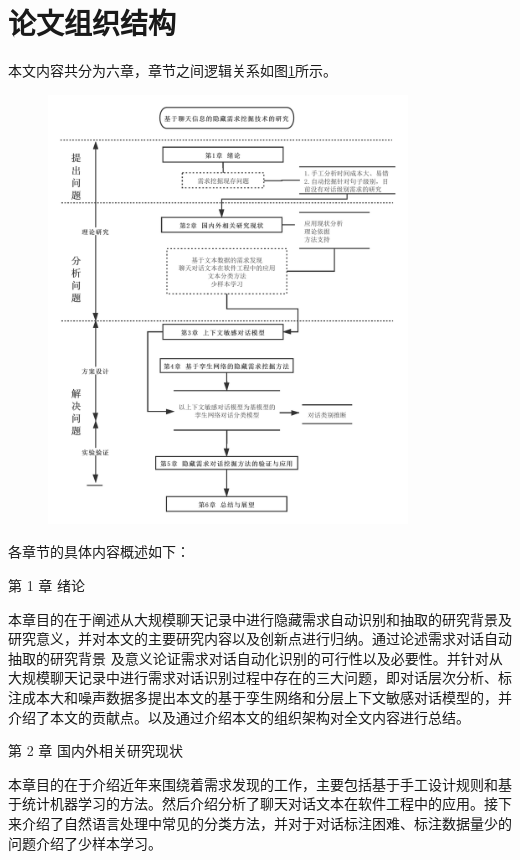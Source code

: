 \section{论文组织结构}
本文内容共分为六章，章节之间逻辑关系如图\ref{fig:chapters}所示。
\begin{figure}[htb]
    \centering
    \includegraphics[width=0.85\textwidth]{Img/chapters.pdf}
    \label{fig:chapters}
\end{figure}

各章节的具体内容概述如下： 

第 1 章 绪论 

本章目的在于阐述从大规模聊天记录中进行隐藏需求自动识别和抽取的研究背景及研究意义，并对本文的主要研究内容以及创新点进行归纳。通过论述需求对话自动抽取的研究背景
及意义论证需求对话自动化识别的可行性以及必要性。并针对从大规模聊天记录中进行需求对话识别过程中存在的三大问题，即对话层次分析、标注成本大和噪声数据多提出本文的基于孪生网络和分层上下文敏感对话模型{\dm}的{\tool}，并介绍了本文的贡献点。以及通过介绍本文的组织架构对全文内容进行总结。 

第 2 章 国内外相关研究现状

本章目的在于介绍近年来围绕着需求发现的工作，主要包括基于手工设计规则和基于统计机器学习的方法。然后介绍分析了聊天对话文本在软件工程中的应用。接下来介绍了自然语言处理中常见的分类方法，并对于对话标注困难、标注数据量少的问题介绍了少样本学习。

